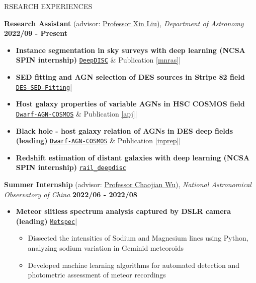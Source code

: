 \documentclass[11pt]{article} %
\begin{document}
\begin{section}{RSEARCH EXPERIENCES}

\textbf{Research Assistant} (advisor: \href{mailto:xinliuxl@illinois.edu}{Professor Xin Liu}), \textit{Department of Astronomy} \hfill \textbf{2022/09 - Present} 
\begin{itemize}[leftmargin=1.5em]
    \item \label{project1} \textbf{Instance segmentation in sky surveys with deep learning (NCSA SPIN internship)} 
    \hfill {\footnotesize \href{https://github.com/burke86/deepdisc}{\texttt{DeepDISC}} \& Publication \ref{mnras}}| %
    \item \textbf{SED fitting and AGN selection of DES sources in Stripe 82 field} 
    \hfill {\footnotesize \href{https://github.com/Chisen-Lupus/DES-SED-fitting}{\texttt{DES-SED-Fitting}}}| %
    \item \textbf{Host galaxy properties of variable AGNs in HSC COSMOS field} 
    \hfill {\footnotesize \href{https://github.com/burke86/dwarf_agn_cosmos}{\texttt{Dwarf-AGN-COSMOS}} \& Publication \ref{apj}}| %
    \item \textbf{Black hole - host galaxy relation of AGNs in DES deep fields (leading)} 
    \hfill {\footnotesize \href{https://github.com/burke86/dwarf_agn_cosmos}{\texttt{Dwarf-AGN-COSMOS}} \& Publication \ref{inprep}}| %
    \item \textbf{Redshift estimation of distant galaxies with deep learning (NCSA SPIN internship)} 
    \hfill {\footnotesize \href{https://github.com/LSSTDESC/rail_deepdisc}{\texttt{rail\_deepdisc}}}| %
\end{itemize}

\textbf{Summer Internship} (advisor: \href{mailto:chjwu@bao.ac.cn}{Professor Chaojian Wu}), \textit{National Astronomical Observatory of China} \hfill \textbf{2022/06 - 2022/08} 
\begin{itemize}[leftmargin=1.5em]
    \item \textbf{Meteor slitless spectrum analysis captured by DSLR camera (leading)} 
    \hfill {\footnotesize \href{https://github.com/Chisen-Lupus/metspec}{\texttt{Metspec}}}| %
    \begin{itemize}[leftmargin=1.5em]
        \item Dissected the intensities of Sodium and Magnesium lines using Python, analyzing sodium variation in Geminid meteoroids
        \item Developed machine learning algorithms for automated detection and photometric assessment of meteor recordings
    \end{itemize}
\end{itemize}


\end{section}
\end{document}
